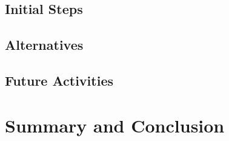 \documentclass[english,twocolumn,smartquotes]{hgbarticle}
\begin{document}
\subsection{Initial Steps}

\lipsum[5-7]

\subsection{Alternatives}

\lipsum[5-7]

\subsection{Future Activities}

\lipsum[5-7]


\section{Summary and Conclusion}

\lipsum[8-9]

\printbibliography      %

\end{document}

